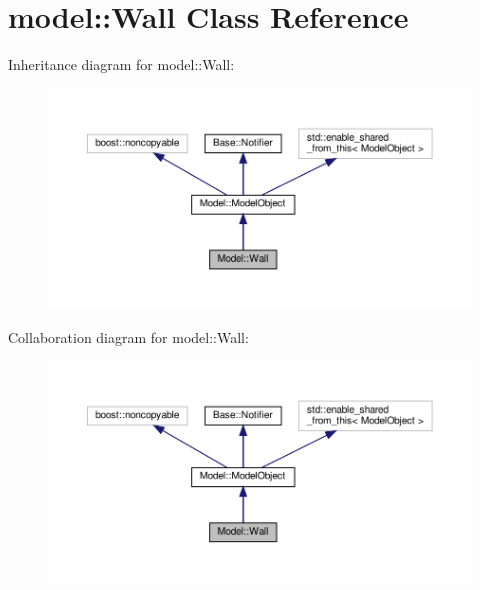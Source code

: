 \hypertarget{class_model_1_1_wall}{}\section{model\+:\+:Wall Class Reference}
\label{class_model_1_1_wall}


Inheritance diagram for model\+:\+:Wall\+:
\nopagebreak
\begin{figure}[H]
\begin{center}
\leavevmode
\includegraphics[width=350pt]{class_model_1_1_wall__inherit__graph}
\end{center}
\end{figure}


Collaboration diagram for model\+:\+:Wall\+:
\nopagebreak
\begin{figure}[H]
\begin{center}
\leavevmode
\includegraphics[width=350pt]{class_model_1_1_wall__coll__graph}
\end{center}
\end{figure}
